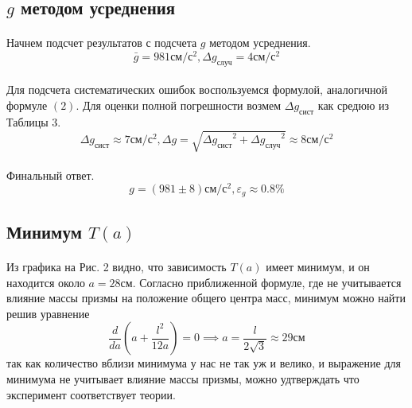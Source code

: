 \documentclass[a4paper, 12pt]{article}
\begin{document}
    \subsection{$g$ методом усреднения}
    \paragraph{}
    Начнем подсчет результатов с подсчета $g$ методом усреднения.
    \[\bar{g}=981см/с^{2}, \Delta g_{случ}=4см/с^{2}\]
    \paragraph{}
    Для подсчета систематических ошибок воспользуемся формулой, аналогичной формуле $(2)$. Для оценки полной погрешности возмем $\Delta g_{сист}$ как средюю из Таблицы 3.
    \[\Delta g_{сист} \approx 7см/с^{2}, \Delta g = \sqrt{{\Delta g_{сист}}^{2} + {\Delta g_{случ}}^{2}}\approx 8см/с^{2}\]
    \paragraph{}
    Финальный ответ.
    \[g=(981\pm8)см/с^{2}, {\varepsilon}_g\approx 0.8\%\]

    \subsection{Минимум $T(a)$}
    \paragraph{}
    Из графика на Рис. 2 видно, что зависимость $T(a)$ имеет минимум, и он находится около $a=28см$. Согласно приближенной формуле, где не учитывается влияние массы призмы на положение общего центра масс, минимум можно найти решив уравнение
    \[\frac{d}{da}(a+\frac{l^2}{12a})=0 \implies a=\frac{l}{2\sqrt{3}}\approx 29см\]
    так как количество вблизи минимума у нас не так уж и велико, и выражение для минимума не учитывает влияние массы призмы, можно удтверждать что эксперимент соответствует теории.
\end{document}
